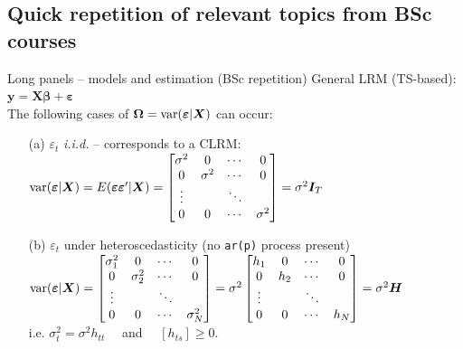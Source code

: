 \documentclass[usenames,dvipsnames]{beamer}
\begin{document}
\subsection*{Quick repetition of relevant topics from BSc courses}
\begin{frame}{Long panels -- models and estimation (BSc repetition)}
\footnotesize
General LRM (TS-based): $\bm{y} = \bm{X\beta}+\bm{\varepsilon}$\\ \medskip
The following cases of $\bm{\Omega} = \textnormal{var}(\bm{\varepsilon}|\bm{X})$ can occur:\\ \medskip
\begin{itemize}
    \item[(a)] $\varepsilon_t$ \textit{i.i.d.} -- corresponds to a CLRM: \\ \medskip $\textnormal{var}(\bm{\varepsilon}|\bm{X}) = E(\bm{\varepsilon \varepsilon}^{\prime}|\bm{X})= 
    \begin{bmatrix}
    \sigma^2 		& 	0 	& 	\cdots	& 	0 \\
        0 	        & 	\sigma^2 		& \cdots 	&  0				\\
     	\vdots	& 		& 	\ddots	& 	 		\\
    0 &		0	&	\cdots &		\sigma^2
\end{bmatrix} = 
    \sigma^2\bm{I}_T$ 
    \bigskip
    \item[(b)] $\varepsilon_t$ under heteroscedasticity (no \texttt{ar(p)} process present)\\ \medskip
    $\textnormal{var}(\bm{\varepsilon}|\bm{X}) = 
    \begin{bmatrix}
    \sigma^2_1 		& 	0 	& 	\cdots	& 	0 \\
        0 	        & 	\sigma^2_2 		& \cdots 	&  0				\\
     	\vdots	& 		& 	\ddots	& 	 		\\
    0 &		0	&	\cdots &		\sigma^2_N
\end{bmatrix} = 
\sigma^2 
\begin{bmatrix}
    h_1 		& 	0 	& 	\cdots	& 	0 \\
        0 	        & 	h_2 		& \cdots 	&  0				\\
     	\vdots	& 		& 	\ddots	& 	 		\\
    0 &		0	&	\cdots &		h_N
\end{bmatrix} = \sigma^2 \bm{H}$\\ \medskip i.e. $\sigma^2_t = \sigma^2 h_{tt}$ ~~and~~ $[h_{ts}]\geq 0$.
\end{itemize}
\end{frame}
\end{document}
